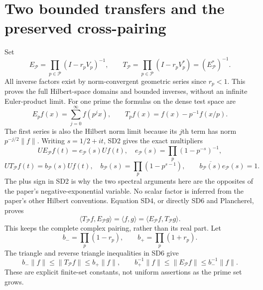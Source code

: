 \documentclass[11pt]{article}
\begin{document}
\section{Two bounded transfers and the preserved cross-pairing}
Set
\[
 E_{\mathcal P}=\prod_{p\in\mathcal P}(I-r_pV_p)^{-1},\qquad
 T_{\mathcal P}=\prod_{p\in\mathcal P}(I-r_pV_p^*)
                 =(E_{\mathcal P}^*)^{-1}.                     \tag{SD4}
\]
All inverse factors exist by norm-convergent geometric series since
$r_p<1$. This proves the full Hilbert-space domains and bounded
inverses, without an infinite Euler-product limit.
For one prime the formulas on the dense test space are
\[
 E_pf(x)=\sum_{j=0}^\infty f(p^jx),\qquad
 T_pf(x)=f(x)-p^{-1}f(x/p).                                    \tag{SD5}
\]
The first series is also the Hilbert norm limit because its $j$th
term has norm $p^{-j/2}\|f\|$.
Writing $s=1/2+it$, SD2 gives the exact multipliers
\[
 UE_{\mathcal P}f(t)=e_{\mathcal P}(s)Uf(t),\quad
 e_{\mathcal P}(s)=\prod_p(1-p^{-s})^{-1},
\]
\[
 UT_{\mathcal P}f(t)=b_{\mathcal P}(s)Uf(t),\quad
 b_{\mathcal P}(s)=\prod_p(1-p^{s-1}),\qquad
 \overline{b_{\mathcal P}(s)}e_{\mathcal P}(s)=1.
                                                               \tag{SD6}
\]
The plus sign in SD2 is why the two spectral arguments here are the
opposites of the paper's negative-exponential variable. No scalar
factor is inferred from the paper's other Hilbert conventions.
Equation SD4, or directly SD6 and Plancherel, proves
\[
 \boxed{\langle T_{\mathcal P}f,E_{\mathcal P}g\rangle
 =\langle f,g\rangle=\langle E_{\mathcal P}f,T_{\mathcal P}g\rangle.}
                                                               \tag{SD7}
\]
This keeps the complete complex pairing, rather than its real part.
Let
\[
 b_- =\prod_p(1-r_p),\qquad b_+=\prod_p(1+r_p).
\]
The triangle and reverse triangle inequalities in SD6 give
\[
 b_-\|f\|\le\|T_{\mathcal P}f\|\le b_+\|f\|,
 \qquad b_+^{-1}\|f\|\le\|E_{\mathcal P}f\|\le b_-^{-1}\|f\|.
                                                               \tag{SD8}
\]
These are explicit finite-set constants, not uniform assertions as
the prime set grows.
\end{document}
